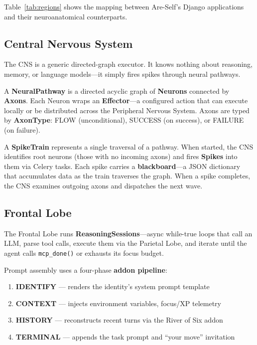 \documentclass[man,12pt,floatsintext]{apa7}
\begin{document}
Table~\ref{tab:regions} shows the mapping between Are-Self's Django applications and
their neuroanatomical counterparts.


\subsection{Central Nervous System}

The CNS is a generic directed-graph executor. It knows nothing about reasoning, memory,
or language models---it simply fires spikes through neural pathways.

A \textbf{NeuralPathway} is a directed acyclic graph of \textbf{Neurons} connected by
\textbf{Axons}. Each Neuron wraps an \textbf{Effector}---a configured action that can
execute locally or be distributed across the Peripheral Nervous System. Axons are typed
by \textbf{AxonType}: FLOW (unconditional), SUCCESS (on success), or FAILURE (on failure).

A \textbf{SpikeTrain} represents a single traversal of a pathway. When started, the CNS
identifies root neurons (those with no incoming axons) and fires \textbf{Spikes} into them
via Celery tasks. Each spike carries a \textbf{blackboard}---a JSON dictionary that
accumulates data as the train traverses the graph. When a spike completes, the CNS examines
outgoing axons and dispatches the next wave.

\subsection{Frontal Lobe}

The Frontal Lobe runs \textbf{ReasoningSessions}---async while-true loops that call an LLM,
parse tool calls, execute them via the Parietal Lobe, and iterate until the agent calls
\texttt{mcp\_done()} or exhausts its focus budget.

Prompt assembly uses a four-phase \textbf{addon pipeline}:

\begin{enumerate}
  \item \textbf{IDENTIFY} --- renders the identity's system prompt template
  \item \textbf{CONTEXT} --- injects environment variables, focus/XP telemetry
  \item \textbf{HISTORY} --- reconstructs recent turns via the River of Six addon
  \item \textbf{TERMINAL} --- appends the task prompt and ``your move'' invitation
\end{enumerate}
\end{document}

